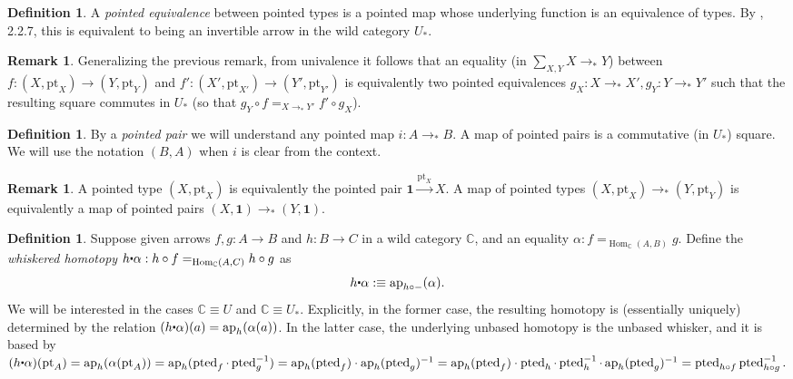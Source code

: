 \documentclass{amsart}
\theoremstyle{definition}
\newtheorem{de}[theorem]{Definition}
\newtheorem{re}[theorem]{Remark}
\newcommand{\ap}{\operatorname{ap}}
\newcommand{\tot}[2]{\sum\limits_{#1}^{}{#2}}
\newcommand{\bs}[1]{\mathrm{pt}_{#1}}
\newcommand{\ptd}[1]{\operatorname{pted}_{#1}}
\newcommand{\pto}{\to_*}
\newcommand{\sgtn}{\mathbf{1}}
\newcommand{\whisk}{\raisebox{0.5ex}{$\displaystyle\centerdot$}}
\begin{document}
\begin{de}\label{de:pointed-equiv}
    A \textit{pointed equivalence} between pointed types is a pointed map whose underlying function is an equivalence of types. By \cite{Flo}, 2.2.7, this is equivalent to being an invertible arrow in the wild category $U_*$.
\end{de}

\begin{re}
    Generalizing the previous remark, from univalence it follows that an equality (in $\tot{X,Y}{X \pto Y}$) between $f : (X, \bs{X}) \to (Y, \bs{Y})$ and $f' : (X', \bs{X'}) \to (Y', \bs{Y'})$ is equivalently two pointed equivalences $g_X: X \pto X', g_Y: Y \pto Y'$ such that the resulting square commutes in $U_*$ (so that $g_Y \circ f =_{X \pto Y'} f' \circ g_X$).
\end{re}

\begin{de}
    By a \textit{pointed pair} we will understand any pointed map $i: A \pto B$. A map of pointed pairs is a commutative (in $U_*$) square. We will use the notation $(B, A)$ when $i$ is clear from the context.
\end{de}

\begin{re}
    A pointed type $(X, \bs{X})$ is equivalently the pointed pair $\sgtn \xrightarrow{\bs{X}} X$. A map of pointed types $(X, \bs{X}) \pto (Y, \bs{Y})$ is equivalently a map of pointed pairs $(X,\sgtn) \pto (Y,\sgtn)$.
\end{re}

\begin{de}
    Suppose given arrows $f,g: A \to B$ and $h: B \to C$ in a wild category $\mathbb{C}$, and an equality $\alpha: f =_{\operatorname{Hom}_{\mathbb{C}}(A,B)} g$. Define the \textit{whiskered homotopy} $h \whisk \alpha: h \circ f =_{\operatorname{Hom}_{\mathbb{C}}(A,C)} h \circ g$ as
    $$h \whisk \alpha : \equiv \ap_{h \circ -}(\alpha).$$
    We will be interested in the cases $\mathbb{C} \equiv U$ and $\mathbb{C} \equiv U_*$. Explicitly, in the former case, the resulting homotopy is (essentially uniquely) determined by the relation $(h \whisk \alpha)(a) = \ap_h (\alpha(a))$. In the latter case, the underlying unbased homotopy is the unbased whisker, and it is based by
    $(h \whisk \alpha)(\bs{A}) = \ap_h(\alpha(\bs{A})) =
    \ap_h(\ptd{f} \cdot \ptd{g}^{-1}) =
    \ap_h(\ptd{f}) \cdot \ap_h(\ptd{g})^{-1} =
    \ap_h(\ptd{f}) \cdot \ptd{h} \cdot \ptd{h}^{-1} \cdot \ap_h(\ptd{g})^{-1} =
    \ptd{h \circ f} \ptd{h \circ g}^{-1}.
    $
\end{de}
\end{document}
